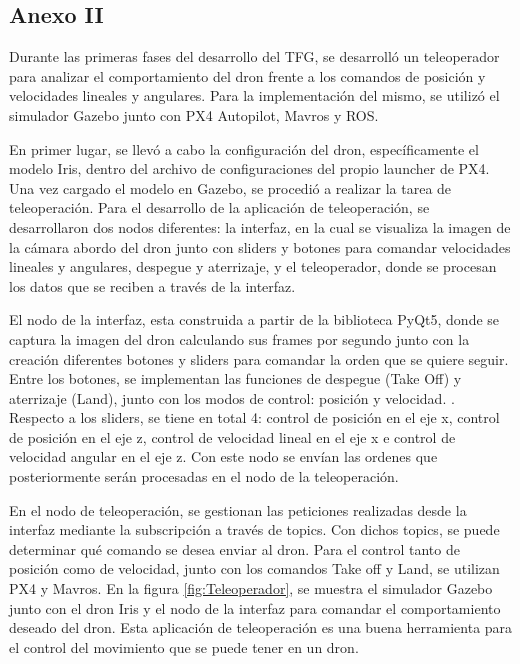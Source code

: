 \begin{appendices}
    \chapter*{Anexo II}
    \label{cap:anexoII}
\setcounter{page}{1}
Durante las primeras fases del desarrollo del TFG, se desarrolló un teleoperador para analizar el comportamiento del dron frente a los comandos de posición y velocidades lineales y angulares.
Para la implementación del mismo, se utilizó el simulador Gazebo junto con PX4 Autopilot, Mavros y ROS. 

En primer lugar, se llevó a cabo la configuración del dron, específicamente el modelo Iris, dentro del archivo de configuraciones del propio launcher de PX4. Una vez cargado 
el modelo en Gazebo, se procedió a realizar la tarea de teleoperación. Para el desarrollo de la aplicación de teleoperación, se desarrollaron 
dos nodos diferentes: la interfaz, en la cual se visualiza la imagen de la cámara abordo del dron junto con sliders y botones para comandar velocidades lineales y angulares, despegue y aterrizaje, y
el teleoperador, donde se procesan los datos que se reciben a través de la interfaz. 

El nodo de la interfaz, esta construida a partir de la biblioteca PyQt5, donde se captura la imagen del dron calculando sus frames por segundo junto con la creación diferentes botones y sliders para comandar 
la orden que se quiere seguir. Entre los botones, se implementan las funciones de despegue (Take Off) y aterrizaje (Land), junto con los modos de control: posición y velocidad.
. Respecto a los sliders, se tiene en total
4: control de posición en el eje x, control de posición en el eje z, control de velocidad lineal en el eje x e control de velocidad angular en el eje z.  Con este nodo se envían las ordenes que 
posteriormente serán procesadas en el nodo de la teleoperación.

En el nodo de teleoperación, se gestionan las peticiones realizadas desde la interfaz mediante la subscripción a través de topics. Con dichos topics, se puede determinar qué comando
se desea enviar al dron. Para el control tanto de posición como de velocidad, junto con los comandos Take off y Land, se utilizan PX4 y Mavros. En la figura \ref{fig:Teleoperador}, 
se muestra el simulador Gazebo junto con el dron Iris y el nodo de la interfaz para comandar el comportamiento deseado del dron. Esta aplicación de teleoperación es una buena herramienta 
para el control del movimiento que se puede tener en un dron.


\end{appendices}
